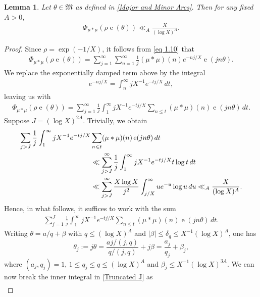 \documentclass[11pt]{amsart}
\numberwithin{equation}{section}
\numberwithin{figure}{section}
\newtheorem{lemma}{Lemma}[section]
\theoremstyle{definition}
\newcommand{\e}{\operatorname{e}}
\begin{document}
\begin{lemma}\label{Major Arcs Theorem}
Let $\theta \in \mathfrak{M}$ as defined in \eqref{Major and Minor Arcs}. Then for any fixed $A>0$,
\begin{align*}
        \Phi_{\mu * \mu}(\rho \e (\theta)) \ll_A \frac{X}{(\log X)^{A}}.
\end{align*}
\end{lemma}
\begin{proof} Since $\rho = \exp(-1/X)$, it follows from \eqref{eq 1.10} that
\begin{align*}
    \Phi_{\mu * \mu}(\rho \e(\theta)) = \sum_{j=1}^\infty\sum_{n=1}^\infty \frac{1}{j} (\mu * \mu)(n) e^{-nj / X} \e(j n \theta).
\end{align*}
We replace the exponentially damped term above by the integral
\begin{align*}
    e^{-nj / X} = \int_n^\infty jX^{-1}e^{-tj/X}\, dt,
\end{align*}
leaving us with
\begin{align*}
    \Phi_{\mu * \mu}(\rho \e(\theta)) = \sum_{j=1}^\infty \frac{1}{j} \int_1^\infty jX^{-1}e^{-tj/X} \sum_{n \leqslant t}  (\mu * \mu)(n) \e(j n \theta) \, dt.
\end{align*}
Suppose $J=(\log X)^{2A}$. Trivially, we obtain
\begin{align}\label{Integral Truncating}
\sum_{j>J}\frac{1}{j} \int_1^\infty jX^{-1}e^{-tj/X} &\sum_{n \leqslant t}  (\mu * \mu)(n) \e(j n \theta) \, dt \notag \\
   & \ll \sum_{j>J}^\infty \frac{1}{j} \int_1^\infty jX^{-1}e^{-tj/X} t \log t \, dt  \notag \\
   &\ll \sum_{j>J}^\infty \frac{X \log X}{j^2} \int_{j/X}^\infty ue^{-u} \log u  \, du \ll_A \frac{X}{(\log X)^{A}}.
\end{align}
Hence, in what follows, it suffices to work with the sum
\begin{align}\label{Truncated J}
\sum_{j=1}^J \frac{1}{j} \int_1^\infty jX^{-1}e^{-tj/X} \sum_{n \leqslant t}  (\mu * \mu)(n) \e(j n \theta) \, dt.
\end{align}
Writing $\theta=a/q+\beta$ with $q\leqslant(\log X)^A$ and $|\beta|\leqslant\delta_q \leqslant X ^{-1}(\log X)^A$, one has
\[ \theta _j := j\theta = \frac{aj/(j,q)}{q/(j,q)}+ j\beta = \frac{a _j}{q _j}+\beta _j,
\]
where $(a _j,q _j)=1$, $1 \leqslant q _j \leqslant q \leqslant(\log X)^{A} $ and $\beta _j \leqslant X ^{-1}(\log X)^{3A}$. We can now break the inner integral in \eqref{Truncated J} as
\begin{align}

\end{align}
\end{proof}
\end{document}
